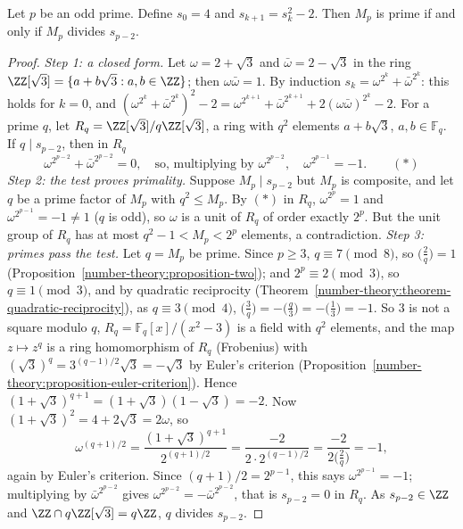 \begin{theorem}\label{prime-numbers:theorem-lucas-lehmer}
Let $p$ be an odd prime. Define $s_0 = 4$ and $s_{k+1} = s_k^2 - 2$. Then $M_p$ is prime if and only if $M_p$ divides $s_{p-2}$.
\end{theorem}

\begin{proof}
\emph{Step 1: a closed form.} Let $\omega = 2 + \sqrt{3}$ and $\bar{\omega} = 2 - \sqrt{3}$ in the ring $\ZZ[\sqrt{3}] = \{a + b\sqrt{3} : a, b \in \ZZ\}$; then $\omega\bar{\omega} = 1$. By induction
$s_k = \omega^{2^k} + \bar{\omega}^{2^k}$: this holds for $k = 0$, and $(\omega^{2^k} + \bar{\omega}^{2^k})^2 - 2 = \omega^{2^{k+1}} + \bar{\omega}^{2^{k+1}} + 2(\omega\bar{\omega})^{2^k} - 2$.
For a prime $q$, let $R_q = \ZZ[\sqrt{3}]/q\ZZ[\sqrt{3}]$, a ring with $q^2$ elements $a + b\sqrt{3}$, $a, b \in \mathbb{F}_q$. If $q \mid s_{p-2}$, then in $R_q$
\[
\omega^{2^{p-2}} + \bar{\omega}^{2^{p-2}} = 0, \quad\text{so, multiplying by } \omega^{2^{p-2}}, \quad \omega^{2^{p-1}} = -1. \qquad (\ast)
\]
\emph{Step 2: the test proves primality.} Suppose $M_p \mid s_{p-2}$ but $M_p$ is composite, and let $q$ be a prime factor of $M_p$ with $q^2 \leq M_p$. By $(\ast)$ in $R_q$, $\omega^{2^p} = 1$ and
$\omega^{2^{p-1}} = -1 \neq 1$ ($q$ is odd), so $\omega$ is a unit of $R_q$ of order exactly $2^p$. But the unit group of $R_q$ has at most $q^2 - 1 < M_p < 2^p$ elements, a contradiction.
\emph{Step 3: primes pass the test.} Let $q = M_p$ be prime. Since $p \geq 3$, $q \equiv 7 \pmod 8$, so $\bigl(\frac{2}{q}\bigr) = 1$ (Proposition~\ref{number-theory:proposition-two}); and
$2^p \equiv 2 \pmod 3$, so $q \equiv 1 \pmod 3$, and by quadratic reciprocity (Theorem~\ref{number-theory:theorem-quadratic-reciprocity}), as $q \equiv 3 \pmod 4$,
$\bigl(\frac{3}{q}\bigr) = -\bigl(\frac{q}{3}\bigr) = -\bigl(\frac{1}{3}\bigr) = -1$. So $3$ is not a square modulo $q$, $R_q = \mathbb{F}_q[x]/(x^2 - 3)$ is a field with $q^2$ elements, and the map
$z \mapsto z^q$ is a ring homomorphism of $R_q$ (Frobenius) with $(\sqrt{3})^q = 3^{(q-1)/2}\sqrt{3} = -\sqrt{3}$ by Euler's criterion (Proposition~\ref{number-theory:proposition-euler-criterion}).
Hence $(1 + \sqrt{3})^{q+1} = (1 + \sqrt{3})(1 - \sqrt{3}) = -2$. Now $(1 + \sqrt{3})^2 = 4 + 2\sqrt{3} = 2\omega$, so
\[
\omega^{(q+1)/2} = \frac{(1 + \sqrt{3})^{q+1}}{2^{(q+1)/2}} = \frac{-2}{2 \cdot 2^{(q-1)/2}} = \frac{-2}{2\bigl(\frac{2}{q}\bigr)} = -1,
\]
again by Euler's criterion. Since $(q + 1)/2 = 2^{p-1}$, this says $\omega^{2^{p-1}} = -1$; multiplying by $\bar{\omega}^{2^{p-2}}$ gives $\omega^{2^{p-2}} = -\bar{\omega}^{2^{p-2}}$, that is $s_{p-2} = 0$
in $R_q$. As $s_{p-2} \in \ZZ$ and $\ZZ \cap q\ZZ[\sqrt{3}] = q\ZZ$, $q$ divides $s_{p-2}$.
\end{proof}

